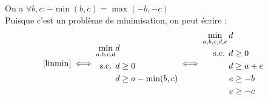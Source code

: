 \documentclass[a4paper,12pt]{article}
\begin{document}
\begin {enumerate}
{    On a $ \forall b, c : -\min(b, c) = \max(-b, -c) $ \\
    Puisque c'est un problème de minimisation, on peut écrire :
    \begin{equation}
        \eqref{linmin} \iff
        \begin{aligned}
            \min _{a, b, c, d} & d \\
            \text{ s.c. } & d \geq 0 \\
            & d \geq a - \min(b, c) \\
        \end{aligned}
        \iff
        \begin{aligned}
            \min _{a, b, c, d, e} d \\
            \text{ s.c. }
            d &\geq 0 \\
            d &\geq a + e \\
            e &\geq -b \\
            e &\geq -c \\   
        \end{aligned}
    \end{equation}
}



\end{enumerate}
\end{document}
